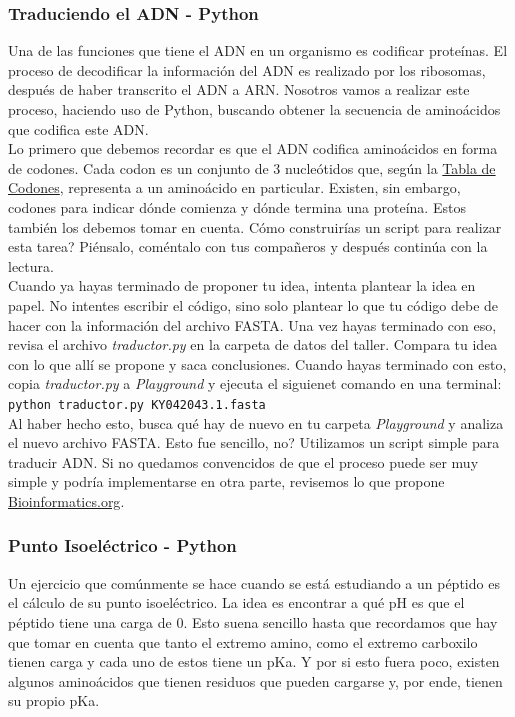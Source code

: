 \documentclass[10pt,letterpaper]{article}
\newcommand{\inlinecode}[1]{
\colorbox{light-gray}{\texttt{#1}}
}
\begin{document}
\subsubsection{Traduciendo el ADN - Python}
Una de las funciones que tiene el ADN en un organismo es codificar prote\'inas. El proceso de decodificar la informaci\'on del ADN es realizado por los ribosomas, despu\'es de haber transcrito el ADN a ARN. Nosotros vamos a realizar este proceso, haciendo uso de Python, buscando obtener la secuencia de amino\'acidos que codifica este ADN.\\

Lo primero que debemos recordar es que el ADN codifica amino\'acidos en forma de codones. Cada codon es un conjunto de 3 nucle\'otidos que, seg\'un la \href{http://rosalind.info/glossary/dna-codon-table/}{Tabla de Codones}, representa a un amino\'acido en particular. Existen, sin embargo, codones para indicar d\'onde comienza y d\'onde termina una prote\'ina. Estos tambi\'en los debemos tomar en cuenta. C\'omo construir\'ias un script para realizar esta tarea? Pi\'ensalo, com\'entalo con tus compa\~neros y despu\'es contin\'ua con la lectura.\\

Cuando ya hayas terminado de proponer tu idea, intenta plantear la idea en papel. No intentes escribir el c\'odigo, sino solo plantear lo que tu c\'odigo debe de hacer con la informaci\'on del archivo FASTA. Una vez hayas terminado con eso, revisa el archivo \textit{traductor.py} en la carpeta de datos del taller. Compara tu idea con lo que all\'i se propone y saca conclusiones. Cuando hayas terminado con esto, copia \textit{traductor.py} a \textit{Playground} y ejecuta el siguienet comando en una terminal: \inlinecode{python traductor.py KY042043.1.fasta}\\

Al haber hecho esto, busca qu\'e hay de nuevo en tu carpeta \textit{Playground} y analiza el nuevo archivo FASTA. Esto fue sencillo, no? Utilizamos un script simple para traducir ADN. Si no quedamos convencidos de que el proceso puede ser muy simple y podr\'ia implementarse en otra parte, revisemos lo que propone \href{http://bioinformatics.org/sms2/translate.html}{Bioinformatics.org}.

\subsubsection{Punto Isoel\'ectrico - Python}
Un ejercicio que com\'unmente se hace cuando se est\'a estudiando a un p\'eptido es el c\'alculo de su punto isoel\'ectrico. La idea es encontrar a qu\'e pH es que el p\'eptido tiene una carga de 0. Esto suena sencillo hasta que recordamos que hay que tomar en cuenta que tanto el extremo amino, como el extremo carboxilo tienen carga y cada uno de estos tiene un pKa. Y por si esto fuera poco, existen algunos amino\'acidos que tienen residuos que pueden cargarse y, por ende, tienen su propio pKa.\\
\end{document}
